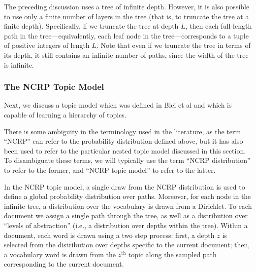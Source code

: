 \documentclass{article}
\newcommand{\nth}{^{\text{th}}}
\begin{document}
The preceding discussion uses a tree of infinite depth.
However, it is also possible to use only a finite number of layers in the tree (that is, to truncate the tree at a finite depth).
Specifically, if we truncate the tree at depth $L$, then each full-length path in the tree---equivalently, each leaf node in the tree---corresponds to a tuple of positive integers of length $L$.
Note that even if we truncate the tree in terms of its depth, it still contains an infinite number of paths, since the width of the tree is infinite.

\subsubsection{The NCRP Topic Model}

Next, we discuss a topic model which was defined in Blei et al \cite{blei2010ncrp} and which is capable of learning a hierarchy of topics.

There is some ambiguity in the terminology used in the literature, as the term ``NCRP'' can refer to the probability distribution defined above, but it has also been used to refer to the particular nested topic model discussed in this section.
To disambiguate these terms, we will typically use the term ``NCRP distribution'' to refer to the former, and ``NCRP topic model'' to refer to the latter.

In the NCRP topic model, a single draw from the NCRP distribution is used to define a global probability distribution over paths.
Moreover, for each node in the infinite tree, a distribution over the vocabulary is drawn from a Dirichlet.
To each document we assign a single path through the tree, as well as a distribution over ``levels of abstraction'' (i.e., a distribution over depths within the tree).
Within a document, each word is drawn using a two step process: first, a depth $z$ is selected from the distribution over depths specific to the current document; then, a vocabulary word is drawn from the $z\nth$ topic along the sampled path corresponding to the current document.
\end{document}
